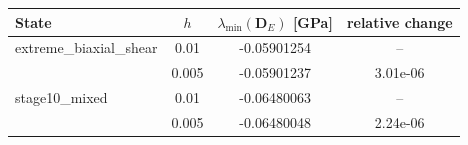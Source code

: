 \begin{tabular}{l c c c}
\toprule
State & $h$ & $\lambda_{\min}(\mathbf{D}_E)$ [GPa] & relative change \\
\midrule
extreme\_biaxial\_shear & 0.01 & -0.05901254 & -- \\
 & 0.005 & -0.05901237 & 3.01e-06 \\
stage10\_mixed & 0.01 & -0.06480063 & -- \\
 & 0.005 & -0.06480048 & 2.24e-06 \\
\bottomrule
\end{tabular}
